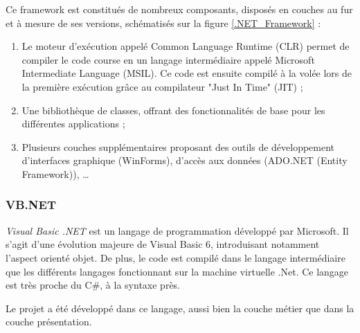 Ce framework est constitués de nombreux composants, disposés en couches au fur et à mesure de ses versions, schématisés sur la figure \ref{.NET_Framework} :
\begin{enumerate}
	\item Le moteur d'exécution appelé Common Language Runtime (CLR) permet de compiler le code course en un langage intermédiaire appelé Microsoft Intermediate Language (MSIL). Ce code est ensuite compilé à la volée lors de la première exécution grâce au compilateur "Just In Time" (JIT) ;
	\item Une bibliothèque de classes, offrant des fonctionnalités de base pour les différentes applications ;
	\item Plusieurs couches supplémentaires proposant des outils de développement d'interfaces graphique (WinForms), d'accès aux données (ADO.NET (Entity Framework)), \ldots
\end{enumerate}


\subsubsection{VB.NET}

\textit{Visual Basic .NET} est un langage de programmation développé par Microsoft. Il s'agit d'une évolution majeure de Visual Basic 6, introduisant notamment l'aspect orienté objet. De plus, le code est compilé dans le langage intermédiaire que les différents langages fonctionnant sur la machine virtuelle .Net. Ce langage est très proche du C\#, à la syntaxe près.

Le projet a été développé dans ce langage, aussi bien la couche métier que dans la couche présentation.


